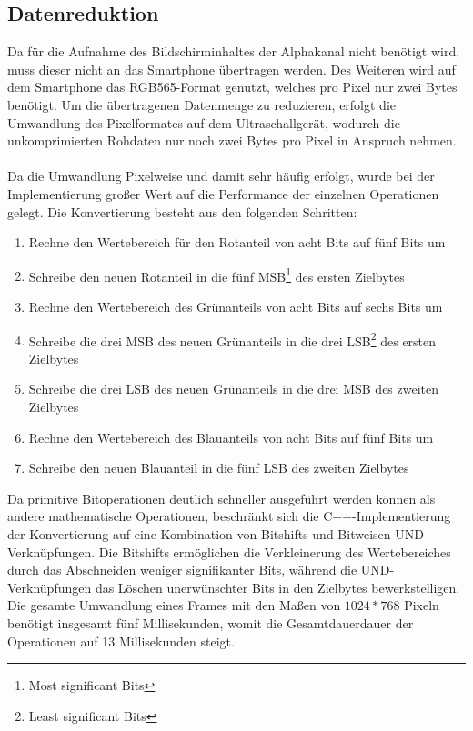 \subsection{Datenreduktion}
Da für die Aufnahme des Bildschirminhaltes der Alphakanal nicht benötigt wird, muss dieser nicht an das Smartphone übertragen werden. Des Weiteren wird auf dem Smartphone das RGB565-Format genutzt, welches pro Pixel nur zwei Bytes benötigt. Um die übertragenen Datenmenge zu reduzieren, erfolgt die Umwandlung des Pixelformates auf dem Ultraschallgerät, wodurch die unkomprimierten Rohdaten nur noch zwei Bytes pro Pixel in Anspruch nehmen.\\
\\
Da die Umwandlung Pixelweise und damit sehr häufig erfolgt, wurde bei der Implementierung großer Wert auf die Performance der einzelnen Operationen gelegt. Die Konvertierung besteht aus den folgenden Schritten:
\begin{enumerate}
\item{Rechne den Wertebereich für den Rotanteil von acht Bits auf fünf Bits um}
\item{Schreibe den neuen Rotanteil in die fünf MSB\footnote{Most significant Bits} des ersten Zielbytes}
\item{Rechne den Wertebereich des Grünanteils von acht Bits auf sechs Bits um}
\item{Schreibe die drei MSB des neuen Grünanteils in die drei LSB\footnote{Least significant Bits} des ersten Zielbytes}
\item{Schreibe die drei LSB des neuen Grünanteils in die drei MSB des zweiten Zielbytes}
\item{Rechne den Wertebereich des Blauanteils von acht Bits auf fünf Bits um}
\item{Schreibe den neuen Blauanteil in die fünf LSB des zweiten Zielbytes}
\end{enumerate}

Da primitive Bitoperationen deutlich schneller ausgeführt werden können als andere mathematische Operationen, beschränkt sich die C++-Implementierung der Konvertierung auf eine Kombination von Bitshifts und Bitweisen UND-Verknüpfungen. Die Bitshifts ermöglichen die Verkleinerung des Wertebereiches durch das Abschneiden weniger signifikanter Bits, während die UND-Verknüpfungen das Löschen unerwünschter Bits in den Zielbytes bewerkstelligen.\\
Die gesamte Umwandlung eines Frames mit den Maßen von $1024*768$ Pixeln benötigt insgesamt fünf Millisekunden, womit die Gesamtdauerdauer der Operationen auf 13 Millisekunden steigt.

